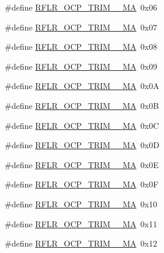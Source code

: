 \begin{DoxyCompactItemize}
\item 
\#define \mbox{\hyperlink{sx1276_regs-_lo_ra_8h_add96158d00533ceefc7b0ab356e4a6cc}{R\+F\+L\+R\+\_\+\+O\+C\+P\+\_\+\+T\+R\+I\+M\+\_\+\_\+\+MA}}~0x06
\item 
\#define \mbox{\hyperlink{sx1276_regs-_lo_ra_8h_a2551f7eacef1961881b7b38c724b393b}{R\+F\+L\+R\+\_\+\+O\+C\+P\+\_\+\+T\+R\+I\+M\+\_\+\_\+\+MA}}~0x07
\item 
\#define \mbox{\hyperlink{sx1276_regs-_lo_ra_8h_a944d696fcf109d939378d53b4f85f9fb}{R\+F\+L\+R\+\_\+\+O\+C\+P\+\_\+\+T\+R\+I\+M\+\_\+\_\+\+MA}}~0x08
\item 
\#define \mbox{\hyperlink{sx1276_regs-_lo_ra_8h_a4928b1121ada662258df2b1741f8f6ea}{R\+F\+L\+R\+\_\+\+O\+C\+P\+\_\+\+T\+R\+I\+M\+\_\+\_\+\+MA}}~0x09
\item 
\#define \mbox{\hyperlink{sx1276_regs-_lo_ra_8h_a701a4cf9ac291205389f408f2a37755b}{R\+F\+L\+R\+\_\+\+O\+C\+P\+\_\+\+T\+R\+I\+M\+\_\+\_\+\+MA}}~0x0A
\item 
\#define \mbox{\hyperlink{sx1276_regs-_lo_ra_8h_a9dde9ac43efb12556edd486e76ceec63}{R\+F\+L\+R\+\_\+\+O\+C\+P\+\_\+\+T\+R\+I\+M\+\_\+\_\+\+MA}}~0x0B
\item 
\#define \mbox{\hyperlink{sx1276_regs-_lo_ra_8h_afe5f0e6dfa00877d42470d27df2cf3ad}{R\+F\+L\+R\+\_\+\+O\+C\+P\+\_\+\+T\+R\+I\+M\+\_\+\_\+\+MA}}~0x0C
\item 
\#define \mbox{\hyperlink{sx1276_regs-_lo_ra_8h_a8e37fe5976b5ec9bc44a3b2af08924b6}{R\+F\+L\+R\+\_\+\+O\+C\+P\+\_\+\+T\+R\+I\+M\+\_\+\_\+\+MA}}~0x0D
\item 
\#define \mbox{\hyperlink{sx1276_regs-_lo_ra_8h_afaa7abafc08d83bcb214bf99ca93ee7c}{R\+F\+L\+R\+\_\+\+O\+C\+P\+\_\+\+T\+R\+I\+M\+\_\+\_\+\+MA}}~0x0E
\item 
\#define \mbox{\hyperlink{sx1276_regs-_lo_ra_8h_aab5037b9ac3e1bc7e2eedccf9193ba28}{R\+F\+L\+R\+\_\+\+O\+C\+P\+\_\+\+T\+R\+I\+M\+\_\+\_\+\+MA}}~0x0F
\item 
\#define \mbox{\hyperlink{sx1276_regs-_lo_ra_8h_a883d12dc95ff98fb03fc31ce6ddc2811}{R\+F\+L\+R\+\_\+\+O\+C\+P\+\_\+\+T\+R\+I\+M\+\_\+\_\+\+MA}}~0x10
\item 
\#define \mbox{\hyperlink{sx1276_regs-_lo_ra_8h_a6a2eac9941486d2997adb00c19f49d98}{R\+F\+L\+R\+\_\+\+O\+C\+P\+\_\+\+T\+R\+I\+M\+\_\+\_\+\+MA}}~0x11
\item 
\#define \mbox{\hyperlink{sx1276_regs-_lo_ra_8h_af9d84c5fa6e8da9a6e9cf68ebe748a18}{R\+F\+L\+R\+\_\+\+O\+C\+P\+\_\+\+T\+R\+I\+M\+\_\+\_\+\+MA}}~0x12

\end{DoxyCompactItemize}

